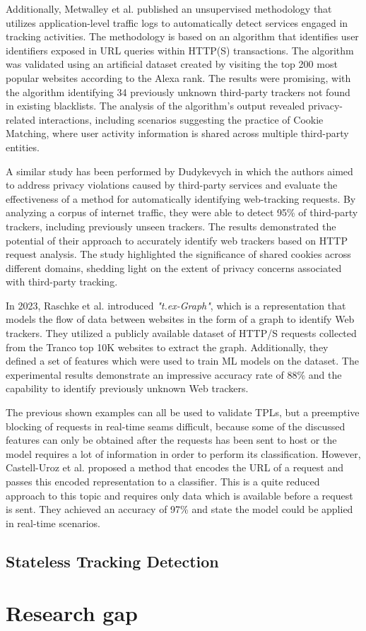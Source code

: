 Additionally, Metwalley et al. \cite{metwalley2015unsupervised} published an unsupervised methodology that utilizes application-level traffic logs to automatically
detect services engaged in tracking activities. The methodology is based on an algorithm that identifies user identifiers exposed
in URL queries within HTTP(S) transactions. The algorithm was validated using an artificial dataset created by visiting the top
200 most popular websites according to the Alexa rank. The results were promising, with the algorithm identifying 34 previously
unknown third-party trackers not found in existing blacklists. The analysis of the algorithm's output revealed privacy-related
interactions, including scenarios suggesting the practice of Cookie Matching, where user activity information is shared across
multiple third-party entities.

A similar study has been performed by Dudykevych \cite{dudykevych2016detecting} in which the authors aimed to address privacy violations caused by third-party services and evaluate the effectiveness
of a method for automatically identifying web-tracking requests. By analyzing a corpus of internet traffic, they were able
to detect 95\% of third-party trackers, including previously unseen trackers. The results demonstrated the potential of
their approach to accurately identify web trackers based on HTTP request analysis. The study highlighted the significance
of shared cookies across different domains, shedding light on the extent of privacy concerns associated with third-party tracking.

In 2023, Raschke et al. \cite{raschke2023} introduced \emph{"t.ex-Graph"}, which is a representation that models the flow of data
between websites in the form of a graph to identify Web trackers. They utilized a publicly available dataset
of HTTP/S requests collected from the Tranco top 10K websites to extract the graph. Additionally, they defined a set of features
which were used to train ML models on the dataset. The experimental results demonstrate an impressive accuracy rate of 88\% and the capability to identify previously unknown Web trackers.

The previous shown examples can all be used to validate TPLs, but a preemptive blocking of requests in real-time seams difficult, because some 
of the discussed features can only be obtained after the requests has been sent to host or the model requires a lot of information in order 
to perform its classification. However, Castell-Uroz et al. \cite{castell2020url} proposed a method that encodes the URL of a request and passes this
encoded representation to a classifier. This is a quite reduced approach to this topic and requires only data which is available before a request
is sent. They achieved an accuracy of 97\% and state the model could be applied in real-time scenarios.
\subsection{Stateless Tracking Detection}

\section{Research gap}


